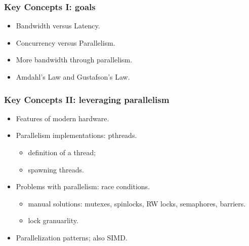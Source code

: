 \documentclass[aspectratio=43]{beamer}
\newenvironment{changemargin}[1]{%
  \begin{list}{}{%
    \setlength{\topsep}{0pt}%
    \setlength{\leftmargin}{#1}%
    \setlength{\rightmargin}{1em}
    \setlength{\listparindent}{\parindent}%
    \setlength{\itemindent}{\parindent}%
    \setlength{\parsep}{\parskip}%
  }%
  \item[]}{\end{list}}
\begin{document}
\begin{frame}
  \frametitle{Key Concepts I: goals}

  \begin{changemargin}{2cm}
  \begin{itemize}
  \item Bandwidth versus Latency.

  \item Concurrency versus Parallelism.

  \item More bandwidth through parallelism.

  \item Amdahl's Law and Gustafson's Law.
  \end{itemize}
  \end{changemargin}
\end{frame}

\begin{frame}
  \frametitle{Key Concepts II: leveraging parallelism}

  \begin{changemargin}{2cm}
  \begin{itemize}
    \item Features of modern hardware.

    \item Parallelism implementations: pthreads.
      \begin{itemize}
        \item definition of a thread;
        \item spawning threads.
      \end{itemize}

    \item Problems with parallelism: race conditions.
      \begin{itemize}
        \item manual solutions: mutexes, spinlocks, RW locks, semaphores, barriers.
        \item lock granuarlity.
      \end{itemize}

    \item Parallelization patterns; also SIMD.
  \end{itemize}
  \end{changemargin}
\end{frame}
\end{document}
